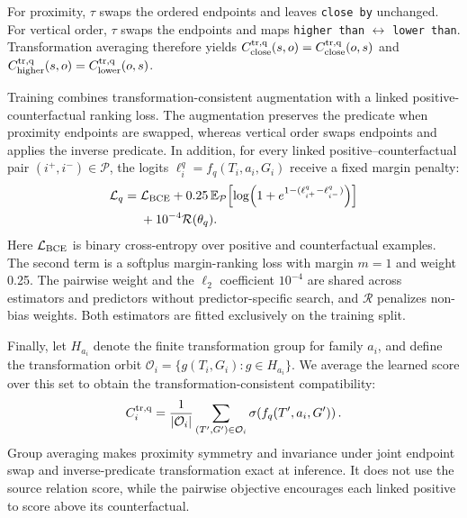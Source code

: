 For proximity, $\tau$ swaps the ordered endpoints and leaves \texttt{close by} unchanged. For vertical order, $\tau$ swaps the endpoints and maps \texttt{higher than} $\leftrightarrow$ \texttt{lower than}. Transformation averaging therefore yields 
$C^{\rm tr,q}_{\rm close}(s,o)=C^{\rm tr,q}_{\rm close}(o,s)$ and
$C^{\rm tr,q}_{\rm higher}(s,o)=C^{\rm tr,q}_{\rm lower}(o,s)$.

Training combines transformation-consistent augmentation with a linked positive-counterfactual ranking loss. The augmentation preserves the predicate when proximity endpoints are swapped, whereas vertical order swaps endpoints and applies the inverse predicate. In addition, for every linked positive--counterfactual pair $(i^+,i^-)\in\mathcal P$, the logits $\ell_i^q=f_q(T_i,a_i,G_i)$ receive a fixed margin penalty:
\begin{equation}
\begin{aligned}
\mathcal L_q={}&\mathcal L_{\rm BCE}
+0.25\,\mathbb E_{\mathcal P}\!
 \left[\log\!\left(1+e^{1-(\ell^q_{i^+}-\ell^q_{i^-})}\right)\right]\\
&+10^{-4}\mathcal R(\theta_q).
\end{aligned}
\end{equation}
Here $\mathcal L_{\rm BCE}$ is binary cross-entropy over positive and counterfactual examples. The second term is a softplus margin-ranking loss with margin $m=1$ and weight 0.25. The pairwise weight and the $\ell_2$ coefficient $10^{-4}$ are shared across estimators and predictors without predictor-specific search, and $\mathcal R$ penalizes non-bias weights.  
Both estimators are fitted exclusively on the training split. 

Finally, let $H_{a_i}$ denote the finite transformation group for family $a_i$, and define the transformation orbit $\mathcal O_i=\{g(T_i,G_i):g\in H_{a_i}\}$. We average the learned score over this set to obtain the transformation-consistent compatibility:
\begin{equation}
C_i^{\rm tr,q}=\frac{1}{|\mathcal O_i|}
\sum_{(T',G')\in\mathcal O_i} \sigma\!\left(f_q(T',a_i,G')\right).
\label{eq:algebra-projection}
\end{equation}
Group averaging makes proximity symmetry and invariance under joint endpoint swap and inverse-predicate transformation exact at inference. It does not use the source relation score, while the pairwise objective encourages each linked positive to score above its counterfactual.


